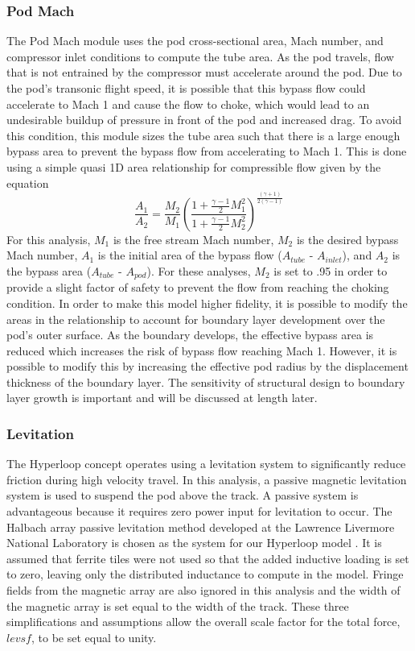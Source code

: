 \subsubsection{Pod Mach}
	The Pod Mach module uses the pod cross-sectional area, Mach number, and
	compressor inlet conditions to compute the tube area. As the pod travels,
	flow that is not entrained by the compressor must accelerate around the pod.
	Due to the pod’s transonic flight speed, it is possible that this bypass
	flow could accelerate to Mach 1 and cause the flow to choke, which would
	lead to an undesirable buildup of pressure in front of the pod and
	increased drag. To avoid this condition, this module sizes the tube area
	such that there is a large enough bypass area to prevent the bypass flow
	from accelerating to Mach 1. This is done using a simple quasi 1D area
	relationship for compressible flow given by the equation
	\begin{equation}
		\label{eq:mach_to_area}
		\frac{A_{1}}{A_{2}}=\frac{M_{2}}{M_{1}} \left( \frac{1+\frac{\gamma -1}{2}M_{1}^{2}}{1+\frac{\gamma -1}{2}M_{2}^{2}} \right)^{\frac{( \gamma +1 )}{2 ( \gamma -1  )}}
	\end{equation}
	For this analysis, $M_1$ is the free stream Mach number, $M_2$ is the
	desired bypass Mach number, $A_1$ is the initial area of the bypass flow
	($A_{tube}$ - $A_{inlet}$), and $A_2$ is the bypass area ($A_{tube}$ - $A_{pod}$).
	For these analyses, $M_2$ is set to .95 in order to provide a slight factor
	of safety to prevent the flow from reaching the choking condition.
	In order to make this model higher fidelity, it is possible to modify the
	areas in the relationship to account for boundary layer development over
	the pod's outer surface. As the boundary develops, the effective bypass area
	is reduced which increases the risk of bypass flow reaching Mach 1. However,
	it is possible to modify this by increasing the effective pod radius by the
	displacement thickness of the boundary layer. The sensitivity of structural
	design to boundary layer growth is important and will be discussed at length later.
\subsubsection{Levitation}

	The Hyperloop concept operates using a levitation system to significantly
	reduce friction during high velocity travel. In this analysis, a
	passive magnetic levitation system is used to suspend the pod above the
	track. A passive system is advantageous because it requires
	zero power input for levitation to occur. The Halbach array passive levitation method
	developed at the Lawrence Livermore National Laboratory is chosen as the
	system for our Hyperloop model \cite{inductrack}. It is assumed that
	ferrite tiles were not used so that the added inductive loading is set to
	zero, leaving only the distributed inductance to compute in the model.
	Fringe fields from the magnetic array are also ignored in this analysis and
	the width of the magnetic array is set equal to the width of the track.
	These three simplifications and assumptions allow the overall scale factor
	for the total force, $levsf$, to be set equal to unity.

